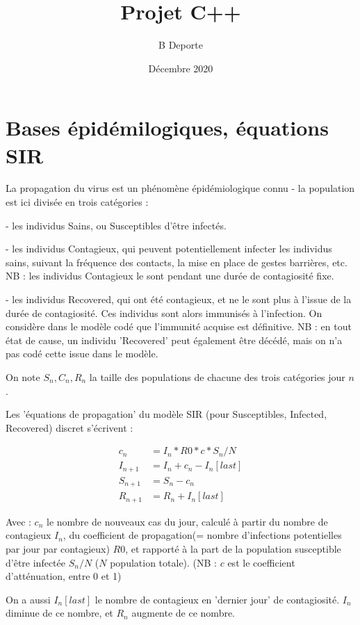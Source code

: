 \documentclass[french]{article}
\title{Projet C++}
\author{B Deporte}
\date{Décembre 2020}
\begin{document}
\maketitle

\section{Bases épidémilogiques, équations SIR}

La propagation du virus est un phénomène épidémiologique connu - la population est ici divisée en trois catégories :

- les individus Sains, ou Susceptibles d'être infectés.

- les individus Contagieux, qui peuvent potentiellement infecter les individus sains,  suivant la fréquence des contacts, la mise en place de gestes barrières, etc. NB : les individus Contagieux le sont pendant une durée de contagiosité fixe.

- les individus Recovered, qui ont été contagieux, et ne le sont plus à l'issue de la durée de contagiosité. Ces individus sont alors immunisés à l'infection. On considère dans le modèle codé que l'immunité acquise est définitive. NB : en tout état de cause, un individu 'Recovered' peut également être décédé, mais on n'a pas codé cette issue dans le modèle.

On note $ S_{n}, C_{n}, R_{n} $ la taille des populations de chacune des trois catégories jour $ n $.

Les 'équations de propagation' du modèle SIR (pour Susceptibles, Infected, Recovered) discret s'écrivent :

\begin{align}
c_{n} &= I_{n} * R0 * c * S_{n}/N \\
I_{n+1} &= I_{n} + c_{n} - I_{n}[last] \\
S_{n+1} &= S_{n} - c_{n} \\
R_{n+1} &= R_{n} + I_{n}[last]
\end{align}

Avec : $ c_{n} $ le nombre de nouveaux cas du jour, calculé à partir du nombre de contagieux $ I_{n} $, du coefficient de propagation(= nombre d'infections potentielles par jour par contagieux) $ R0 $, et rapporté à la part de la population susceptible d'être infectée $ S_{n}/N $ ($N$ population totale). (NB : $c$ est le coefficient d'atténuation, entre 0 et 1)

On a aussi $ I_{n}[last] $ le nombre de contagieux en 'dernier jour' de contagiosité. $I_{n}$ diminue de ce nombre, et $R_{n}$ augmente de ce nombre.
\end{document}
